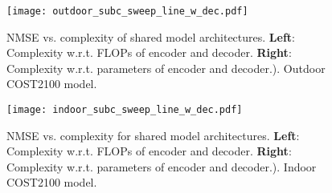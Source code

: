 \begin{figure}[!hbtp]
    \centering
    \texttt{[image: outdoor\_subc\_sweep\_line\_w\_dec.pdf]}
    \caption{NMSE vs. complexity of shared model architectures. \textbf{Left}: Complexity w.r.t. FLOPs of encoder and decoder. \textbf{Right}: Complexity w.r.t. parameters of encoder and decoder.). Outdoor COST2100 model.}
    \label{fig:outdoor_nmse_vs_complexity_w_dec}
\end{figure}

\begin{figure}[!hbtp]
    \centering
    \texttt{[image: indoor\_subc\_sweep\_line\_w\_dec.pdf]}
    \caption{NMSE vs. complexity for shared model architectures. \textbf{Left}: Complexity w.r.t. FLOPs of encoder and decoder. \textbf{Right}: Complexity w.r.t. parameters of encoder and decoder.). Indoor COST2100 model.}
    \label{fig:indoor_nmse_vs_complexity_w_dec}
\end{figure}